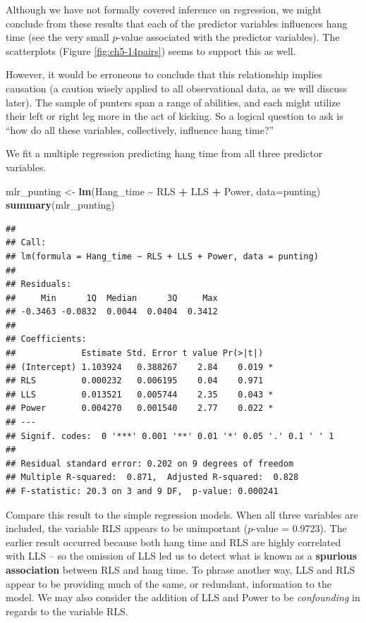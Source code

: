 \documentclass[
]{book}
\newenvironment{Shaded}{\begin{snugshade}}{\end{snugshade}}
\newcommand{\AttributeTok}[1]{\textcolor[rgb]{0.13,0.29,0.53}{#1}}
\newcommand{\FunctionTok}[1]{\textcolor[rgb]{0.13,0.29,0.53}{\textbf{#1}}}
\newcommand{\NormalTok}[1]{#1}
\newcommand{\OtherTok}[1]{\textcolor[rgb]{0.56,0.35,0.01}{#1}}
\newcommand{\SpecialCharTok}[1]{\textcolor[rgb]{0.81,0.36,0.00}{\textbf{#1}}}
\begin{document}
Although we have not formally covered inference on regression, we might conclude from these results that each of the predictor variables influences hang time (see the very small \(p\)-value associated with the predictor variables).
The scatterplots (Figure \ref{fig:ch5-14pairs}) seems to support this as well.

However, it would be erroneous to conclude that this relationship implies causation (a caution wisely applied to all observational data, as we will discuss later).
The sample of punters span a range of abilities, and each might utilize their left or right leg more in the act of kicking.
So a logical question to ask is ``how do all these variables, collectively, influence hang time?''

We fit a multiple regression predicting hang time from all three predictor variables.

\begin{Shaded}
\begin{Highlighting}[]
\NormalTok{mlr\_punting }\OtherTok{\textless{}{-}} \FunctionTok{lm}\NormalTok{(Hang\_time }\SpecialCharTok{\textasciitilde{}}\NormalTok{ RLS }\SpecialCharTok{+}\NormalTok{ LLS }\SpecialCharTok{+}\NormalTok{ Power, }\AttributeTok{data=}\NormalTok{punting)}
\FunctionTok{summary}\NormalTok{(mlr\_punting)}
\end{Highlighting}
\end{Shaded}

\begin{verbatim}
## 
## Call:
## lm(formula = Hang_time ~ RLS + LLS + Power, data = punting)
## 
## Residuals:
##     Min      1Q  Median      3Q     Max 
## -0.3463 -0.0832  0.0044  0.0404  0.3412 
## 
## Coefficients:
##             Estimate Std. Error t value Pr(>|t|)  
## (Intercept) 1.103924   0.388267    2.84    0.019 *
## RLS         0.000232   0.006195    0.04    0.971  
## LLS         0.013521   0.005744    2.35    0.043 *
## Power       0.004270   0.001540    2.77    0.022 *
## ---
## Signif. codes:  0 '***' 0.001 '**' 0.01 '*' 0.05 '.' 0.1 ' ' 1
## 
## Residual standard error: 0.202 on 9 degrees of freedom
## Multiple R-squared:  0.871,  Adjusted R-squared:  0.828 
## F-statistic: 20.3 on 3 and 9 DF,  p-value: 0.000241
\end{verbatim}

Compare this result to the simple regression models.
When all three variables are included, the variable RLS appears to be unimportant (\(p\)-value = 0.9723).
The earlier result occurred because both hang time and RLS are highly correlated with LLS -- so the omission of LLS led us to detect what is known as a \textbf{spurious association} between RLS and hang time.
To phrase another way, LLS and RLS appear to be providing much of the same, or redundant, information to the model.
We may also consider the addition of LLS and Power to be \emph{confounding} in regards to the variable RLS.
\end{document}
